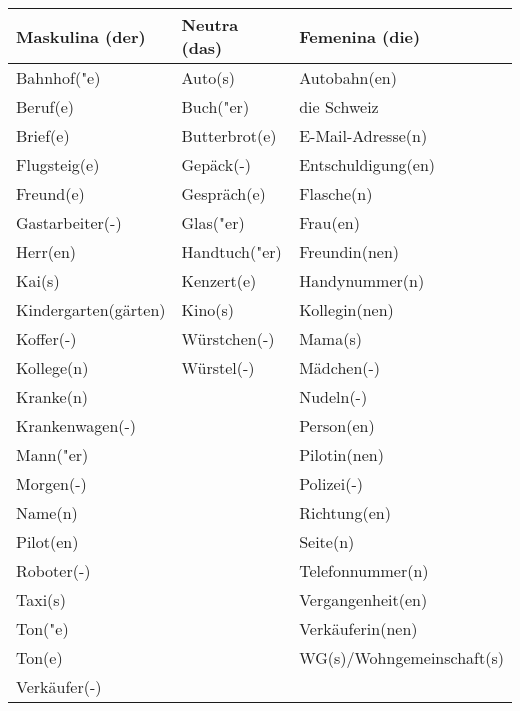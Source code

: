 \documentclass{article}
\renewcommand{\arraystretch}{1}
\begin{document}
\begin{table}[h!]
    \centering
    \label{tab:tabla1}
    \renewcommand{\arraystretch}{1.5}
    \begin{tabular}{|>{\raggedright\arraybackslash}p{5cm}|>{\raggedright\arraybackslash}p{5cm}|>{\raggedright\arraybackslash}p{5cm}|}
        \hline
        \rowcolor{gray!20} \textbf{Maskulina (der)} & \textbf{Neutra (das)} & \textbf{Femenina (die)} \\
        \hline
        Bahnhof("e) & Auto(s) & Autobahn(en) \\\hline
        Beruf(e) & Buch("er) & die Schweiz \\\hline
        Brief(e) & Butterbrot(e) & E-Mail-Adresse(n) \\\hline
        Flugsteig(e) & Gepäck(-) & Entschuldigung(en) \\\hline
        Freund(e) & Gespräch(e) & Flasche(n) \\\hline
        Gastarbeiter(-) & Glas("er) & Frau(en) \\\hline
        Herr(en) & Handtuch("er) & Freundin(nen) \\\hline
        Kai(s) & Kenzert(e) & Handynummer(n) \\\hline
        Kindergarten(gärten) & Kino(s) & Kollegin(nen) \\\hline
        Koffer(-) & Würstchen(-) & Mama(s) \\\hline
        Kollege(n) & Würstel(-) & Mädchen(-) \\\hline
        Kranke(n) &  & Nudeln(-) \\\hline
        Krankenwagen(-) &  & Person(en) \\\hline
        Mann("er) &  & Pilotin(nen) \\\hline
        Morgen(-) &  & Polizei(-) \\\hline
        Name(n) &  & Richtung(en) \\\hline
        Pilot(en) &  & Seite(n) \\\hline
        Roboter(-) &  & Telefonnummer(n) \\\hline
        Taxi(s) &  & Vergangenheit(en) \\\hline
        Ton("e) &  & Verkäuferin(nen) \\\hline
        Ton(e) &  & WG(s)/Wohngemeinschaft(s) \\\hline
        Verkäufer(-) &  &  \\\hline
    \end{tabular}
\end{table}
\end{document}
